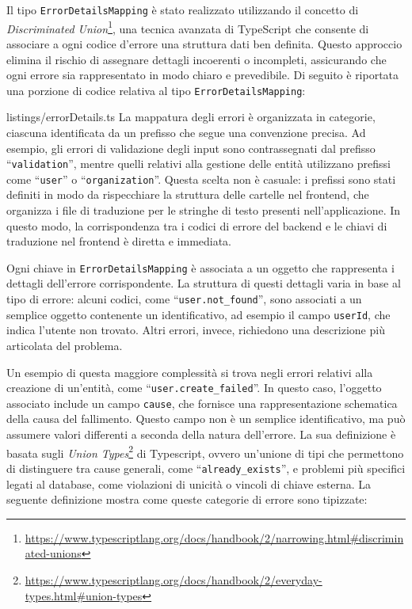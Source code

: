 Il tipo \texttt{ErrorDetailsMapping} è stato realizzato utilizzando il concetto di \textit{Discriminated Union}\footnote{\url{https://www.typescriptlang.org/docs/handbook/2/narrowing.html\#discriminated-unions}}, una tecnica avanzata di TypeScript che consente di associare a ogni codice d’errore una struttura dati ben definita. Questo approccio elimina il rischio di assegnare dettagli incoerenti o incompleti, assicurando che ogni errore sia rappresentato in modo chiaro e prevedibile.
%
Di seguito è riportata una porzione di codice relativa al tipo \texttt{ErrorDetailsMapping}:


{listings/errorDetails.ts}
%
La mappatura degli errori è organizzata in categorie, ciascuna identificata da un prefisso che segue una convenzione precisa. Ad esempio, gli errori di validazione degli input sono contrassegnati dal prefisso ``\texttt{validation}'', mentre quelli relativi alla gestione delle entità utilizzano prefissi come ``\texttt{user}'' o ``\texttt{organization}''. Questa scelta non è casuale: i prefissi sono stati definiti in modo da rispecchiare la struttura delle cartelle nel frontend, che organizza i file di traduzione per le stringhe di testo presenti nell’applicazione. In questo modo, la corrispondenza tra i codici di errore del backend e le chiavi di traduzione nel frontend è diretta e immediata.

Ogni chiave in \texttt{ErrorDetailsMapping} è associata a un oggetto che rappresenta i dettagli dell’errore corrispondente. La struttura di questi dettagli varia in base al tipo di errore: alcuni codici, come ``\texttt{user.not\_found}'', sono associati a un semplice oggetto contenente un identificativo, ad esempio il campo \texttt{userId}, che indica l’utente non trovato. Altri errori, invece, richiedono una descrizione più articolata del problema.

Un esempio di questa maggiore complessità si trova negli errori relativi alla creazione di un'entità, come ``\texttt{user.create\_failed}''. In questo caso, l’oggetto associato include un campo \texttt{cause}, che fornisce una rappresentazione schematica della causa del fallimento. Questo campo non è un semplice identificativo, ma può assumere valori differenti a seconda della natura dell’errore. La sua definizione è basata sugli \textit{Union Types}\footnote{\url{https://www.typescriptlang.org/docs/handbook/2/everyday-types.html\#union-types}} di Typescript, ovvero un’unione di tipi che permettono di distinguere tra cause generali, come ``\texttt{already\_exists}'', e problemi più specifici legati al database, come violazioni di unicità o vincoli di chiave esterna.
%
La seguente definizione mostra come queste categorie di errore sono tipizzate:


